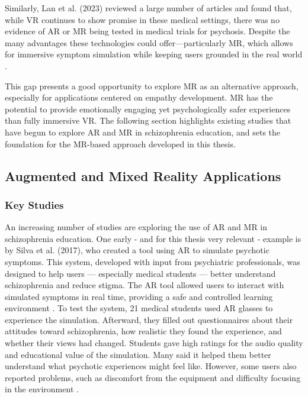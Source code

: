 Similarly, Lan et al. (2023) reviewed a large number of articles and found that, while VR continues to show promise in these medical settings, there was no evidence of AR or MR being tested in medical trials for psychosis. Despite the many advantages these technologies could offer—particularly MR, which allows for immersive symptom simulation while keeping users grounded in the real world \cite{Lan2023}.

This gap presents a good opportunity to explore MR as an alternative approach, especially for applications centered on empathy development. MR has the potential to provide emotionally engaging yet psychologically safer experiences than fully immersive VR. The following section highlights existing studies that have begun to explore AR and MR in schizophrenia education, and sets the foundation for the MR-based approach developed in this thesis.


\subsection{Augmented and Mixed Reality Applications}
\subsubsection{Key Studies}
\label{sec:keystudies}

An increasing number of studies are exploring the use of AR and MR in schizophrenia education. One early - and for this thesis very relevant - example is by Silva et al. (2017), who created a tool using AR to simulate psychotic symptoms. This system, developed with input from psychiatric professionals, was designed to help users — especially medical students — better understand schizophrenia and reduce stigma. The AR tool allowed users to interact with simulated symptoms in real time, providing a safe and controlled learning environment \cite{Silva2017}. To test the system, 21 medical students used AR glasses to experience the simulation. Afterward, they filled out questionnaires about their attitudes toward schizophrenia, how realistic they found the experience, and whether their views had changed. Students gave high ratings for the audio quality and educational value of the simulation. Many said it helped them better understand what psychotic experiences might feel like. However, some users also reported problems, such as discomfort from the equipment and difficulty focusing in the environment \cite{Silva2017}.

